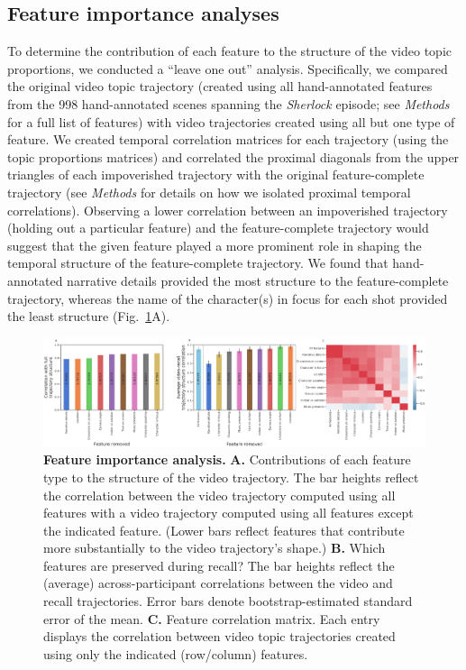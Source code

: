 \documentclass{article}
\begin{document}
\subsection*{Feature importance analyses}
To determine the contribution of each feature to the structure of the video topic proportions, we conducted a ``leave one out'' analysis.  Specifically, we compared the original video topic trajectory (created using all hand-annotated features from the 998 hand-annotated scenes spanning the \textit{Sherlock} episode; see \textit{Methods} for a full list of features) with video trajectories created using all but one type of feature.  We created temporal correlation matrices for each trajectory (using the topic proportions matrices) and correlated the proximal diagonals from the upper triangles of each impoverished trajectory with the original feature-complete trajectory (see \textit{Methods} for details on how we isolated proximal temporal correlations).  Observing a lower correlation between an impoverished trajectory (holding out a particular feature) and the feature-complete trajectory would suggest that the given feature played a more prominent role in shaping the temporal structure of the feature-complete trajectory.  We found that hand-annotated narrative details provided the most structure to the feature-complete trajectory, whereas the name of the character(s) in focus for each shot provided the least structure (Fig.~\ref{fig:feature-importance}A).

\begin{figure}[]
\centering
\includegraphics[width=1\textwidth]{figs/feature_value}
\caption{\small \textbf{Feature importance analysis.} \textbf{A.} Contributions of each feature type to the structure of the video trajectory. The bar heights reflect the correlation between the video trajectory computed using all features with a video trajectory computed using all features except the indicated feature.  (Lower bars reflect features that contribute more substantially to the video trajectory's shape.) \textbf{B.} Which features are preserved during recall?  The bar heights reflect the (average) across-participant correlations between the video and recall trajectories.  Error bars denote bootstrap-estimated standard error of the mean.  \textbf{C.} Feature correlation matrix.  Each entry displays the correlation between video topic trajectories created using only the indicated (row/column) features.}
\label{fig:feature-importance}
\end{figure}
\end{document}
